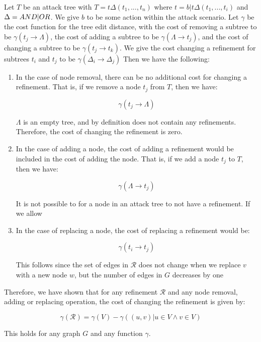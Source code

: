 \begin{lemma} \label{lem:refinement_change_cost} Let $T$ be an attack tree with $T = t\Delta(t_1,...,t_n)$ where $t = b|t\Delta(t_1,...,t_i)$ and $\Delta = AND|OR$. We give $b$ to be some action within the attack scenario. Let $\gamma$ be the cost function for the tree edit distance, with the cost of removing a subtree to be $\gamma(t_j \rightarrow {\Lambda})$, the cost of adding a subtree to be $\gamma({\Lambda}\rightarrow t_j)$, and the cost of changing a subtree to be $\gamma(t_j \rightarrow t_k)$. We give the cost changing a refinement for subtrees $t_i$ and $t_j$ to be $\gamma(\Delta_i \rightarrow \Delta_j)$ Then we have the following:

\begin{enumerate} 
      \item In the case of node removal, there can be no additional cost for changing a refinement. That is, if we remove a node $t_j$ from $T$, then we have:

            $$\gamma(t_j \rightarrow {\Lambda})$$

            $\Lambda$ is an empty tree, and by definition does not contain any refinements. Therefore, the cost of changing the refinement is zero.

      \item In the case of adding a node, the cost of adding a refinement would be included in the cost of adding the node. That is, if we add a node $t_j$ to $T$, then we have:

            $$\gamma(\Lambda \rightarrow {t_j})$$

            It is not possible to for a node in an attack tree to not have a refinement. If we allow

      \item In the case of replacing a node, the cost of replacing a refinement would be:

            $$\gamma({t_i} \rightarrow {t_j})$$

            This follows since the set of edges in $\mathcal{R}$ does not change when we replace $v$ with a new node $w$, but the number of edges in $G$ decreases by one

\end{enumerate}

    Therefore, we have shown that for any refinement $\mathcal{R}$ and any node removal, adding or replacing operation, the cost of changing the refinement is given by:

    $$\gamma(\mathcal{R}) = \gamma(V) - \gamma({(u, v) | u \in V \land v \in V})$$

    This holds for any graph $G$ and any function $\gamma$.

\end{lemma}

